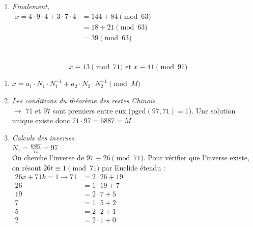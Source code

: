 \begin{solution}
\begin{enumerate}
        \item \textit{Finalement,} \\
        \( \begin{aligned}
            x = 4 \cdot 9 \cdot 4 + 3 \cdot 7 \cdot 4 &= 144 + 84 \pmod{63} \\
            &= 18 + 21 \pmod{63} \\
            &= 39 \pmod{63} \\
        \end{aligned}
        \)
    \end{enumerate}

\end{solution}


\begin{solution}
    \text{ } \\
    \[ x \equiv 13 \pmod{71} \text{ et } x \equiv 41 \pmod{97} \]

    \begin{enumerate}
        \item \(x = a_1 \cdot N_{1} \cdot N_{1}^{-1} + a_2 \cdot N_{2} \cdot N_{2}^{-1} \pmod{M} \)
        
        \item \textit{Les conditions du théorème des restes Chinois} \\
        $\rightarrow$ 71 et 97 sont premiers entre eux (\(\text{pgcd}(97,71) = 1 \)). Une solution unique existe donc \(71 \cdot 97 = 6887= M\)
        
        \item \textit{Calculs des inverses} \\
        \(N_1 = \frac{6887}{71} = 97 \) \\
        On cherche l'inverse de $97 \equiv 26 \pmod{71}$. Pour vérifier que l'inverse existe, on résout $26 t \equiv 1 \pmod{71}$ par Euclide étendu : \\
        \( 
        \begin{aligned}
            26 x + 71 k = 1 \rightarrow 71 &= 2 \cdot 26 +19 \\
                                        26 &= 1 \cdot 19 + 7 \\
                                        19 &= 2 \cdot 7 + 5 \\
                                        7 &= 1 \cdot 5 + 2 \\
                                        5 &= 2 \cdot 2 + 1 \\
                                        2 &= 2 \cdot 1 + 0
            \end{aligned}
        \) \\


\end{enumerate}
\end{solution}
